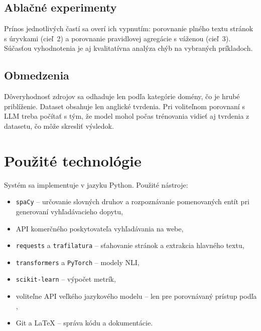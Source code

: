 \documentclass[a4paper,11pt]{article}
\begin{document}
\subsection{Ablačné experimenty}

Prínos jednotlivých častí sa overí ich vypnutím: porovnanie plného textu
stránok s úryvkami (cieľ~2) a porovnanie pravidlovej agregácie s váženou
(cieľ~3). Súčasťou vyhodnotenia je aj kvalitatívna analýza chýb na
vybraných príkladoch.

\subsection{Obmedzenia}

Dôveryhodnosť zdrojov sa odhaduje len podľa kategórie domény, čo je hrubé
priblíženie. Dataset obsahuje len anglické tvrdenia. Pri voliteľnom
porovnaní s LLM treba počítať s tým, že model mohol počas trénovania vidieť
aj tvrdenia z datasetu, čo môže skresliť výsledok.

\section{Použité technológie}

Systém sa implementuje v jazyku Python. Použité nástroje:
\begin{itemize}
  \item \texttt{spaCy} -- určovanie slovných druhov a rozpoznávanie
        pomenovaných entít pri generovaní vyhľadávacieho dopytu,
  \item API komerčného poskytovateľa vyhľadávania na webe,
  \item \texttt{requests} a \texttt{trafilatura} -- sťahovanie stránok
        a extrakcia hlavného textu,
  \item \texttt{transformers} a \texttt{PyTorch} -- modely NLI,
  \item \texttt{scikit-learn} -- výpočet metrík,
  \item voliteľne API veľkého jazykového modelu -- len pre porovnávaný
        prístup podľa \cite{nath-agent},
  \item Git a LaTeX -- správa kódu a dokumentácie.
\end{itemize}




\end{document}
